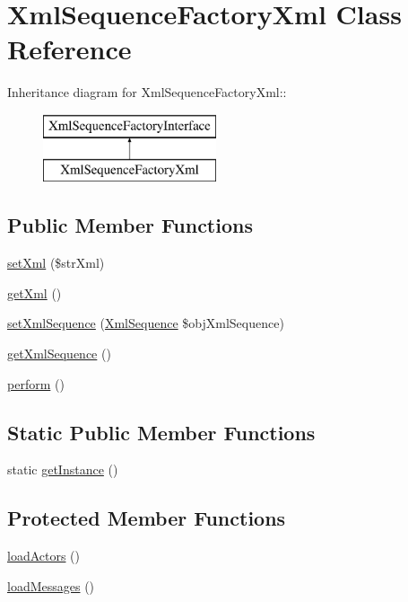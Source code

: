 \hypertarget{class_xml_sequence_factory_xml}{
\section{XmlSequenceFactoryXml Class Reference}
\label{class_xml_sequence_factory_xml}
}
Inheritance diagram for XmlSequenceFactoryXml::\begin{figure}[H]
\begin{center}
\leavevmode
\includegraphics[height=2cm]{class_xml_sequence_factory_xml}
\end{center}
\end{figure}
\subsection*{Public Member Functions}
\begin{CompactItemize}
\item 
\hyperlink{class_xml_sequence_factory_xml_8ac34bd040fb3627c7b4ca12808d427f}{setXml} (\$strXml)
\item 
\hyperlink{class_xml_sequence_factory_xml_1ff0576538bf186559839cada0449ddf}{getXml} ()
\item 
\hyperlink{class_xml_sequence_factory_xml_65967fe6cc76b0c0b28aa39e9acffcab}{setXmlSequence} (\hyperlink{class_xml_sequence}{XmlSequence} \$objXmlSequence)
\item 
\hyperlink{class_xml_sequence_factory_xml_feb0ab0d5955fcae20ff5062fa59fd79}{getXmlSequence} ()
\item 
\hyperlink{class_xml_sequence_factory_xml_469121070b5e6118f202517380558019}{perform} ()
\end{CompactItemize}
\subsection*{Static Public Member Functions}
\begin{CompactItemize}
\item 
static \hyperlink{class_xml_sequence_factory_xml_c93fbec81f07e5d15f80db907e63dc10}{getInstance} ()
\end{CompactItemize}
\subsection*{Protected Member Functions}
\begin{CompactItemize}
\item 
\hyperlink{class_xml_sequence_factory_xml_390c089130460866b440b2f6f73dd136}{loadActors} ()
\item 
\hyperlink{class_xml_sequence_factory_xml_589f548f18802f9a10d0eaca5cab970c}{loadMessages} ()
\end{CompactItemize}
